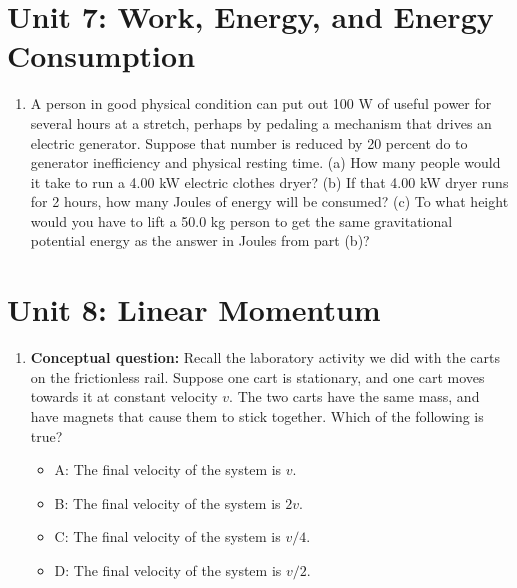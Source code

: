 \documentclass[10pt]{article}
\begin{document}
\section{Unit 7: Work, Energy, and Energy Consumption}
\begin{enumerate}
\item A person in good physical condition can put out 100 W of useful power for several hours at a stretch, perhaps by pedaling a mechanism that drives an electric generator.  Suppose that number is reduced by 20 percent do to generator inefficiency and physical resting time.  (a) How many people would it take to run a 4.00 kW electric clothes dryer? (b) If that 4.00 kW dryer runs for 2 hours, how many Joules of energy will be consumed?  (c) To what height would you have to lift a 50.0 kg person to get the same gravitational potential energy as the answer in Joules from part (b)? \\ \vspace{2cm}
\end{enumerate}

\section{Unit 8: Linear Momentum}
\begin{enumerate}
\item \textbf{Conceptual question:} Recall the laboratory activity we did with the carts on the frictionless rail.  Suppose one cart is stationary, and one cart moves towards it at constant velocity $v$.  The two carts have the same mass, and have magnets that cause them to stick together.  Which of the following is true?
\begin{itemize}
\item A: The final velocity of the system is $v$.
\item B: The final velocity of the system is $2v$.
\item C: The final velocity of the system is $v/4$.
\item D: The final velocity of the system is $v/2$.
\end{itemize}
\end{enumerate}
\end{document}
